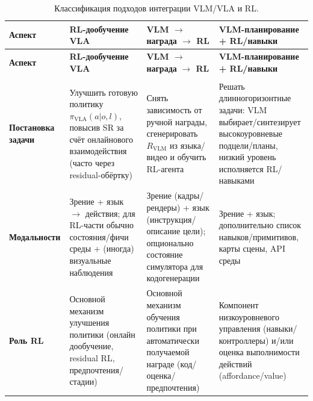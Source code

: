 \begingroup
\setlength{\tabcolsep}{3pt}
\renewcommand{\arraystretch}{1.2}
\footnotesize
\begin{longtable}{>{\raggedright\arraybackslash}p{} >{\raggedright\arraybackslash}p{} >{\raggedright\arraybackslash}p{} >{\raggedright\arraybackslash}p{}}
\caption{Классификация подходов интеграции VLM/VLA и RL.}
\label{tab:integration-classification}\\
\toprule
\textbf{Аспект} & \makecell[l]{\textbf{RL-дообучение}\\\textbf{VLA}} & \makecell[l]{\textbf{VLM $\rightarrow$ награда}\\\textbf{$\rightarrow$ RL}} & \makecell[l]{\textbf{VLM-планирование}\\\textbf{+ RL/навыки}} \\
\midrule
\endfirsthead
\toprule
\textbf{Аспект} & \makecell[l]{\textbf{RL-дообучение}\\\textbf{VLA}} & \makecell[l]{\textbf{VLM $\rightarrow$ награда}\\\textbf{$\rightarrow$ RL}} & \makecell[l]{\textbf{VLM-планирование}\\\textbf{+ RL/навыки}} \\
\midrule
\endhead
\midrule
\multicolumn{4}{r}{\small Продолжение на следующей странице} \\
\endfoot
\bottomrule
\endlastfoot
\textbf{Постановка задачи} &
Улучшить готовую политику $\pi_{\text{VLA}}(a|o,l)$, повысив SR за счёт онлайнового взаимодействия (часто через residual-обёртку) &
Снять зависимость от ручной награды, сгенерировать $R_{\text{VLM}}$ из языка/видео и обучить RL-агента &
Решать длинногоризонтные задачи: VLM выбирает/синтезирует высокоуровневые подцели/планы, низкий уровень исполняется RL/навыками \\
\textbf{Модальности} &
Зрение + язык $\rightarrow$ действия; для RL-части обычно состояния/фичи среды + (иногда) визуальные наблюдения &
Зрение (кадры/рендеры) + язык (инструкция/описание цели); опционально состояние симулятора для кодогенерации &
Зрение + язык; дополнительно список навыков/примитивов, карты сцены, API среды \\
\textbf{Роль RL} &
Основной механизм улучшения политики (онлайн дообучение, residual RL, предпочтения/стадии) &
Основной механизм обучения политики при автоматически получаемой награде (код/оценка/предпочтения) &
Компонент низкоуровневого управления (навыки/контроллеры) и/или оценка выполнимости действий (affordance/value) \\

\end{longtable}
